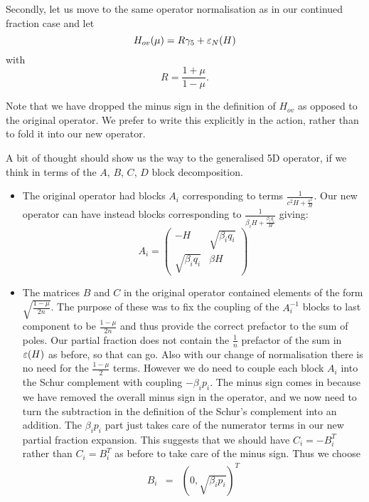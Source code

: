\documentclass[12pt]{article}
\begin{document}
Secondly, let us move to the same operator normalisation as in our
continued fraction case and let 
\begin{equation}
H_{ov}(\mu) = R \gamma_5 + \varepsilon_{N}(H)
\end{equation}
with 
\begin{equation}
R = \frac{1+\mu}{1-\mu} .
\end{equation}

Note that we have dropped the minus sign in the definition of $H_{ov}$
as opposed to the original operator. We prefer to write this explicitly
in the action, rather than to fold it into our new operator.

A bit of thought should show us the way to the generalised 5D operator,
if we think in terms of the $A$, $B$, $C$, $D$ block decomposition.
\begin{itemize} 
\item
The original operator had blocks $A_i$ corresponding to terms $\frac{1}{c^2H + \frac{s^2}{H}}$. Our new operator can have instead blocks corresponding to $\frac{1}{\beta_i H + \frac{\beta_i q_i}{H}}$ giving:
\begin{equation}
A_i = \left( \begin{array}{cc} 
 -H & \sqrt{\beta_i q_i} \\
\sqrt{\beta_i q_i} &  \beta H 
\end{array} \right) 
\end{equation}
\item
The matrices $B$ and $C$ in the original operator contained elements of the 
form $\sqrt{\frac{1-\mu}{2n}}$. The purpose of these was to fix the coupling 
of the $A_i^{-1}$ blocks to last component  to be $\frac{1-\mu}{2n}$ and thus 
provide the correct prefactor to the sum of poles. Our partial fraction does not contain the $\frac{1}{n}$ prefactor of the sum in $\varepsilon(H)$ as before, so that can go. Also with
our change of normalisation there is no need for the $\frac{1-\mu}{2}$ 
terms. However we do need to couple each block $A_i$ into the Schur complement
with coupling $-\beta_i p_i$. The minus sign comes in because we have
removed the overall minus sign in the operator, and we now need to turn
the subtraction in the definition of the Schur's complement into an
addition. The $\beta_i p_i$ part just takes care of the numerator terms
in our new partial fraction expansion. This suggests that we should have $C_i = -B_i^{T}$ rather than $C_i = B_i^T$ as before to take care of the 
minus sign. Thus we choose
\begin{eqnarray}
B_{i} &=&  \left( 0,  \sqrt{ \beta_i p_i } \right)^{T} \\

\end{eqnarray}
\end{itemize}
\end{document}
